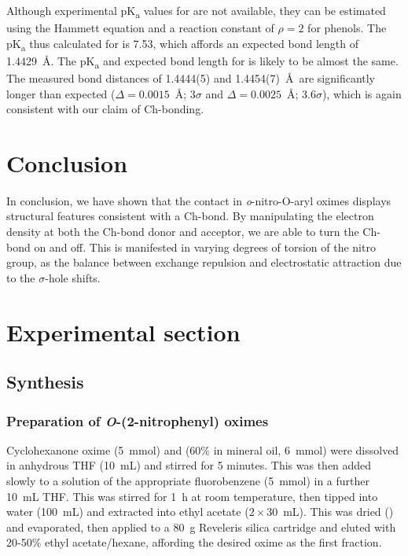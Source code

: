 \begin{refsection}
Although experimental pK\textsubscript{a} values for  are not available, they can be estimated using the Hammett equation and a reaction constant of $\rho=2$ for phenols.\autocite{Hansch1991}
The pK\textsubscript{a} thus calculated for  is 7.53, which affords an expected bond length of 1.4429~\AA.\@
The pK\textsubscript{a} and expected bond length for  is likely to be almost the same.
The measured bond distances of 1.4444(5) and 1.4454(7)~\AA\ are significantly longer than expected ($\Delta = 0.0015$~\AA{}; 3$\sigma$ and $\Delta = 0.0025$~\AA{}; 3.6$\sigma$), which is again consistent with our claim of Ch-bonding.

\section{Conclusion}

In conclusion, we have shown that the  contact in \textit{o}-nitro-O-aryl oximes displays structural features consistent with a Ch-bond.
By manipulating the electron density at both the Ch-bond donor and acceptor, we are able to turn the Ch-bond on and off.
This is manifested in varying degrees of torsion of the nitro group, as the balance between exchange repulsion and electrostatic attraction due to the $\sigma$-hole shifts.

\section{Experimental section}

\subsection{Synthesis}

\subsubsection[Preparation of \refcmpd{cyclohexanone-oxime-2np,cyclohexanone-oxime-2n.5nme2p,cyclohexanone-oxime-2n.5mp}]{Preparation of \emph{O}-(2-nitrophenyl) oximes }
Cyclohexanone oxime (5~mmol) and  (60\% in mineral oil, 6~mmol) were dissolved in anhydrous THF (10~mL) and stirred for 5 minutes.
This was then added slowly to a solution of the appropriate fluorobenzene (5~mmol) in a further 10~mL THF.\@
This was stirred for 1~h at room temperature, then tipped into water (100~mL) and extracted into ethyl acetate ($2\times30$~mL).
This was dried () and evaporated, then applied to a 80~g Reveleris silica cartridge and eluted with 20-50\% ethyl acetate/hexane, affording the desired oxime as the first fraction.


\end{refsection}
